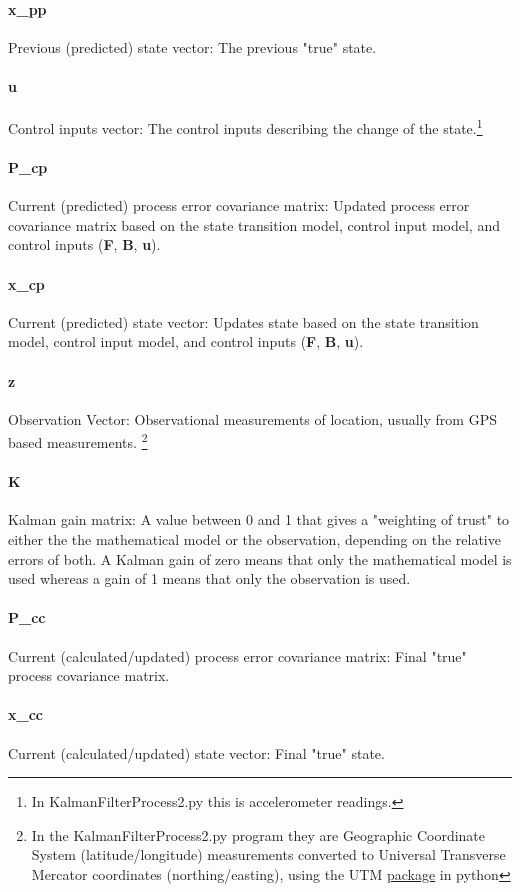 \documentclass{article}
\begin{document}
\paragraph{x\_pp}
Previous (predicted) state vector: The previous "true" state.
\paragraph{u}
Control inputs vector: The control inputs describing the change of the state.\footnote{In KalmanFilterProcess2.py this is accelerometer readings.}
\paragraph{P\_cp}
Current (predicted) process error covariance matrix: Updated process error covariance matrix based on the state transition model, control input model, and control inputs (\textbf{F}, \textbf{B}, \textbf{u}).
\paragraph{x\_cp}
Current (predicted) state vector: Updates state  based on the state transition model, control input model, and control inputs (\textbf{F}, \textbf{B}, \textbf{u}).
\paragraph{z}
Observation Vector: Observational measurements of location, usually from GPS based measurements. \footnote{In the KalmanFilterProcess2.py program they are Geographic Coordinate System (latitude/longitude) measurements converted to Universal Transverse Mercator coordinates (northing/easting), using the UTM \href{https://pypi.org/project/utm/}{package} in python  }  
\paragraph{K}
Kalman gain matrix: A value between 0 and 1 that gives a "weighting of trust" to either the the mathematical model or the observation, depending on the relative errors of both. A Kalman gain of zero means that only the mathematical model is used whereas a gain of 1 means that only the observation is used.
\paragraph{P\_cc}
Current (calculated/updated) process error covariance matrix: Final "true" process covariance matrix.
\paragraph{x\_cc}
Current (calculated/updated) state vector: Final "true" state.
\end{document}
